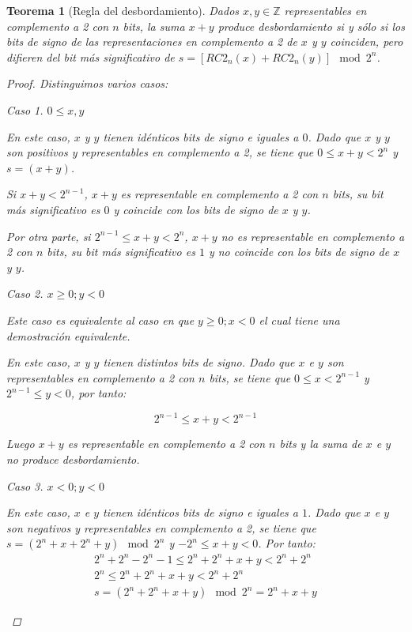 \documentclass[spanish,a4paper,12pt,titlepage]{article}
\newtheorem{theorem}{Teorema}%
\theoremstyle{definition}
\theoremstyle{remark}
\newtheorem{case}{Caso}
\newcommand{\bbZ}{\mathbb{Z}}
\begin{document}
\begin{theorem}[Regla del desbordamiento]\label{theorem-overflow-law}
    Dados $x, y \in \bbZ$ representables en complemento a 2 con $n$ bits, la suma $x+y$ produce desbordamiento si y sólo si los bits de signo de las representaciones en complemento a 2 de $x$ y $y$ coinciden, pero difieren del bit más significativo de $s = [RC2_n(x)+RC2_n(y)] \mod 2^n$.
    \begin{proof}
        Distinguimos varios casos:

        \begin{case}
            $0 \le x,y$

            En este caso, $x$ y $y$ tienen idénticos bits de signo e iguales a $0$. Dado que $x$ y $y$ son positivos y representables en complemento a 2, se tiene que $0 \le x+y < 2^n$ y $s = (x + y)$.

            Si $x+y < 2^{n-1}$, $x+y$ es representable en complemento a 2 con $n$ bits, su bit más significativo es $0$ y coincide con los bits de signo de $x$ y $y$.

            Por otra parte, si $2^{n-1} \le x+y < 2^n$, $x+y$ no es representable en complemento a 2 con $n$ bits, su bit más significativo es $1$ y no coincide con los bits de signo de $x$ y $y$.
        \end{case}

        \begin{case}
            $x \ge 0; y < 0$

            Este caso es equivalente al caso en que $y \ge 0; x < 0$ el cual tiene una demostración equivalente.

            En este caso, $x$ y $y$ tienen distintos bits de signo. Dado que $x$ e $y$ son representables en complemento a 2 con $n$ bits, se tiene que $0 \le x < 2^{n-1}$ y $2^{n-1} \le y < 0$, por tanto:

            \[
                2^{n-1} \le x + y < 2^{n-1}
            \]

            Luego $x+y$ es representable en complemento a 2 con $n$ bits y la suma de $x$ e $y$ no produce desbordamiento.
        \end{case}

        \begin{case}
            $x < 0; y < 0$

            En este caso, $x$ e $y$ tienen idénticos bits de signo e iguales a $1$. Dado que $x$ e $y$ son negativos y representables en complemento a 2, se tiene que $s = (2^n + x + 2^n + y) \mod 2^n$ y $-2^n \le x+y < 0$. Por tanto:
            \begin{align*}
                2^n + 2^n - 2^n-1 \le 2^n + 2^n + x + y < 2^n + 2^n\\
                2^n \le 2^n + 2^n + x + y < 2^n + 2^n\\
                s = (2^n + 2^n + x + y) \mod 2^n = 2^n + x + y
            \end{align*}


\end{case}
\end{proof}
\end{theorem}
\end{document}
